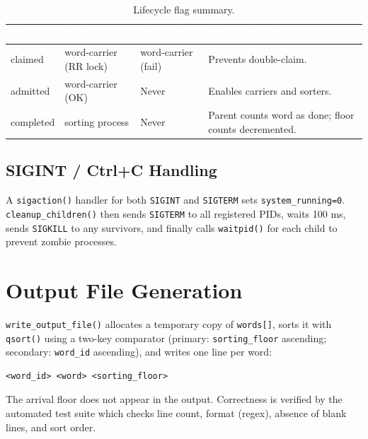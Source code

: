 \documentclass[12pt,a4paper]{article}
\newcommand{\code}[1]{\texttt{\small #1}}
\begin{document}
\begin{table}[h!]
\centering
\caption{Lifecycle flag summary.}
\begin{tabularx}{\textwidth}{>{\ttfamily}l l l X}
\toprule
\rowcolor{darkblue}
\textcolor{white}{\textbf{Flag}} &
\textcolor{white}{\textbf{Set by}} &
\textcolor{white}{\textbf{Cleared by}} &
\textcolor{white}{\textbf{Effect when 1}} \\
\midrule
claimed   & word-carrier (RR lock) & word-carrier (fail) & Prevents double-claim. \\
\rowcolor{rowgray}
admitted  & word-carrier (OK)      & Never               & Enables carriers and sorters. \\
completed & sorting process        & Never               & Parent counts word as done; floor counts decremented. \\
\bottomrule
\end{tabularx}
\end{table}

\subsection{SIGINT / Ctrl+C Handling}

A \code{sigaction()} handler for both \code{SIGINT} and \code{SIGTERM} sets
\code{system\_running=0}. \code{cleanup\_children()} then sends \code{SIGTERM} to
all registered PIDs, waits 100 ms, sends \code{SIGKILL} to any survivors, and
finally calls \code{waitpid()} for each child to prevent zombie processes.

\section{Output File Generation}

\code{write\_output\_file()} allocates a temporary copy of \code{words[]},
sorts it with \code{qsort()} using a two-key comparator (primary:
\code{sorting\_floor} ascending; secondary: \code{word\_id} ascending), and writes
one line per word:

\begin{lstlisting}[language={},caption={Output file format (no blank lines).}]
<word_id> <word> <sorting_floor>
\end{lstlisting}

The arrival floor does not appear in the output. Correctness is verified by the
automated test suite which checks line count, format (regex), absence of blank
lines, and sort order.
\end{document}
